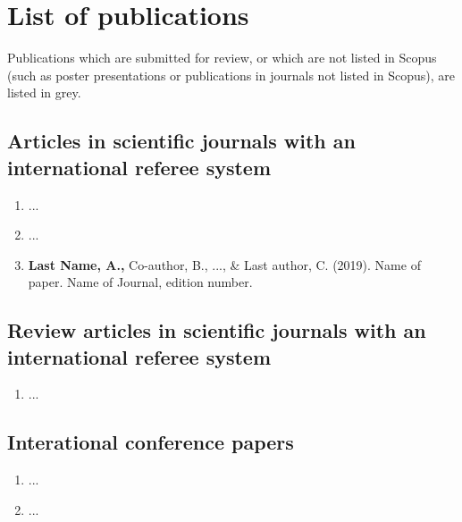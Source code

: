 \chapter{List of publications}

Publications which are submitted for review, or which are not listed in Scopus (such as poster presentations or publications in journals not listed in Scopus), are listed in grey.

\section*{Articles in scientific journals with an international referee system}



\begin{enumerate}

    
    \item ...
    
    
    \item ...
    
	
	\item \textbf{Last Name, A.,} Co-author, B., ..., \& Last author, C. (2019). Name of paper. Name of Journal, edition number.
	
\end{enumerate}
\section*{Review articles in scientific journals with an international referee system}

\begin{enumerate}

	
	\item ...


\end{enumerate}

\section*{Interational conference papers}



\begin{enumerate}
	
	
	
	
	
	\item ...
	
	
	\item ...
	
\end{enumerate}
